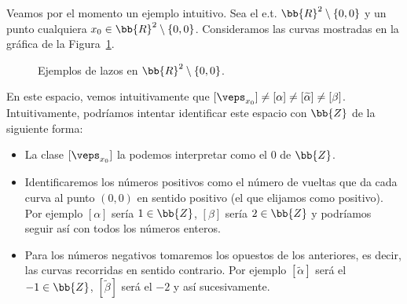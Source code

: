 \begin{ejemplo} Veamos por el momento un ejemplo intuitivo. Sea el e.t. $\bb{R}^2\setminus \{0,0\}$ y un punto cualquiera $x_0\in \bb{R}^2\setminus \{0,0\}$. Consideramos las curvas mostradas en la gráfica de la Figura~\ref{fig:lazos_R2_menos_0}.
    \begin{figure}[ht]
        \centering
        \caption{Ejemplos de lazos en $\bb{R}^2\setminus \{0,0\}$.}
        \label{fig:lazos_R2_menos_0}
    \end{figure}%
    
    En este espacio, vemos intuitivamente que $[\veps_{x_0}] \neq [\alpha] \neq \left[\tilde{\alpha}\right] \neq [\beta]$. Intuitivamente, podríamos intentar identificar este espacio con $\bb{Z}$ de la siguiente forma:
    \begin{itemize}
        \item La clase $[\veps_{x_0}]$ la podemos interpretar como el $0$ de $\bb{Z}$.
        \item Identificaremos los números positivos como el número de vueltas que da cada curva al punto $(0,0)$ en sentido positivo (el que elijamos como positivo). Por ejemplo $[\alpha]$ sería $1\in \bb{Z}$, $[\beta]$ sería $2\in \bb{Z}$ y podríamos seguir así con todos los números enteros.
        \item Para los números negativos tomaremos los opuestos de los anteriores, es decir, las curvas recorridas en sentido contrario. Por ejemplo $\left[\tilde{\alpha}\right]$ será el $-1\in \bb{Z}$, $[\tilde{\beta}]$ será el $-2$ y así sucesivamente. 
    \end{itemize}
    

\end{ejemplo}
